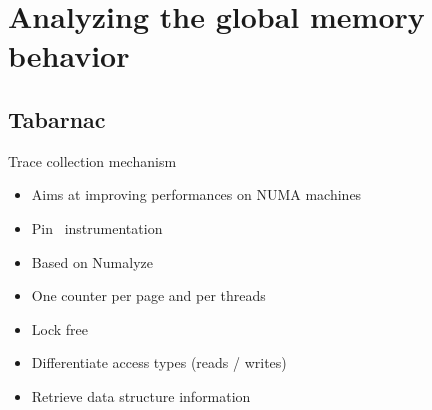 \documentclass[xcolor={usenames,dvipsnames},hyperref={pdfusetitle}]{beamer}
\begin{document}
\section{Analyzing the global memory behavior}

\subsection{Tabarnac}

\begin{frame}{Trace collection mechanism}
    \begin{itemize}[<+-|alert@+>]
        \item Aims at improving performances on NUMA machines
        \item Pin~\cite{Luk05Pin} instrumentation
        \item Based on Numalyze~\cite{Diener15Characterizing}
        \item One counter per page and per threads
        \item Lock free
        \item Differentiate access types (reads / writes)
        \item Retrieve data structure information
    \end{itemize}
\end{frame}
\end{document}
